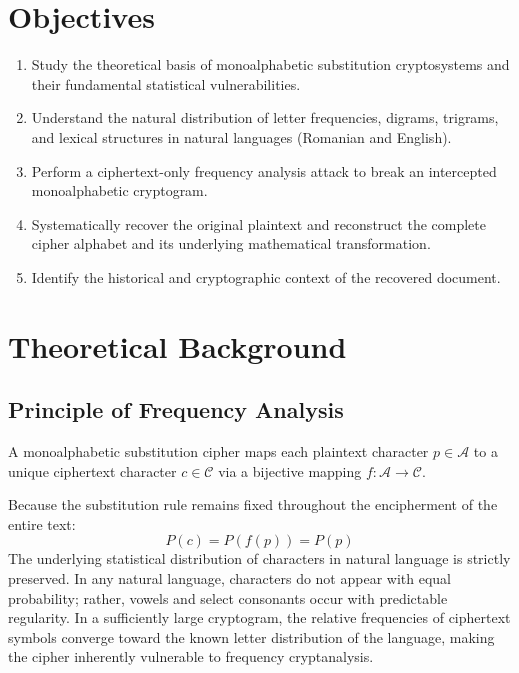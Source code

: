 \documentclass[12pt,a4paper]{article}
\begin{document}
\section{Objectives}
\begin{enumerate}
    \item Study the theoretical basis of monoalphabetic substitution cryptosystems and their fundamental statistical vulnerabilities.
    \item Understand the natural distribution of letter frequencies, digrams, trigrams, and lexical structures in natural languages (Romanian and English).
    \item Perform a ciphertext-only frequency analysis attack to break an intercepted monoalphabetic cryptogram.
    \item Systematically recover the original plaintext and reconstruct the complete cipher alphabet and its underlying mathematical transformation.
    \item Identify the historical and cryptographic context of the recovered document.
\end{enumerate}

\section{Theoretical Background}

\subsection{Principle of Frequency Analysis}
A monoalphabetic substitution cipher maps each plaintext character $p \in \mathcal{A}$ to a unique ciphertext character $c \in \mathcal{C}$ via a bijective mapping $f: \mathcal{A} \to \mathcal{C}$.

Because the substitution rule remains fixed throughout the encipherment of the entire text:
\begin{equation}
    P(c) = P(f(p)) = P(p)
\end{equation}
The underlying statistical distribution of characters in natural language is strictly preserved. In any natural language, characters do not appear with equal probability; rather, vowels and select consonants occur with predictable regularity. In a sufficiently large cryptogram, the relative frequencies of ciphertext symbols converge toward the known letter distribution of the language, making the cipher inherently vulnerable to frequency cryptanalysis.
\end{document}
